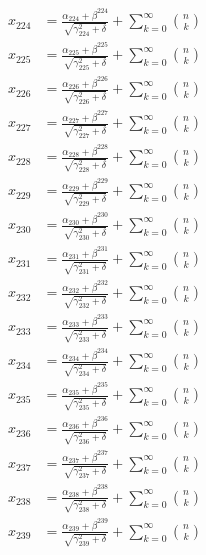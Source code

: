 \documentclass{article}
\begin{document}
\begin{align}
  x_{224} &= \frac{\alpha_{224} + \beta^{224}}{\sqrt{\gamma_{224}^2 + \delta}} + \sum_{k=0}^{\infty} \binom{n}{k} \label{eq:224} \\
  x_{225} &= \frac{\alpha_{225} + \beta^{225}}{\sqrt{\gamma_{225}^2 + \delta}} + \sum_{k=0}^{\infty} \binom{n}{k} \label{eq:225} \\
  x_{226} &= \frac{\alpha_{226} + \beta^{226}}{\sqrt{\gamma_{226}^2 + \delta}} + \sum_{k=0}^{\infty} \binom{n}{k} \label{eq:226} \\
  x_{227} &= \frac{\alpha_{227} + \beta^{227}}{\sqrt{\gamma_{227}^2 + \delta}} + \sum_{k=0}^{\infty} \binom{n}{k} \label{eq:227} \\
  x_{228} &= \frac{\alpha_{228} + \beta^{228}}{\sqrt{\gamma_{228}^2 + \delta}} + \sum_{k=0}^{\infty} \binom{n}{k} \label{eq:228} \\
  x_{229} &= \frac{\alpha_{229} + \beta^{229}}{\sqrt{\gamma_{229}^2 + \delta}} + \sum_{k=0}^{\infty} \binom{n}{k} \label{eq:229} \\
  x_{230} &= \frac{\alpha_{230} + \beta^{230}}{\sqrt{\gamma_{230}^2 + \delta}} + \sum_{k=0}^{\infty} \binom{n}{k} \label{eq:230} \\
  x_{231} &= \frac{\alpha_{231} + \beta^{231}}{\sqrt{\gamma_{231}^2 + \delta}} + \sum_{k=0}^{\infty} \binom{n}{k} \label{eq:231} \\
  x_{232} &= \frac{\alpha_{232} + \beta^{232}}{\sqrt{\gamma_{232}^2 + \delta}} + \sum_{k=0}^{\infty} \binom{n}{k} \label{eq:232} \\
  x_{233} &= \frac{\alpha_{233} + \beta^{233}}{\sqrt{\gamma_{233}^2 + \delta}} + \sum_{k=0}^{\infty} \binom{n}{k} \label{eq:233} \\
  x_{234} &= \frac{\alpha_{234} + \beta^{234}}{\sqrt{\gamma_{234}^2 + \delta}} + \sum_{k=0}^{\infty} \binom{n}{k} \label{eq:234} \\
  x_{235} &= \frac{\alpha_{235} + \beta^{235}}{\sqrt{\gamma_{235}^2 + \delta}} + \sum_{k=0}^{\infty} \binom{n}{k} \label{eq:235} \\
  x_{236} &= \frac{\alpha_{236} + \beta^{236}}{\sqrt{\gamma_{236}^2 + \delta}} + \sum_{k=0}^{\infty} \binom{n}{k} \label{eq:236} \\
  x_{237} &= \frac{\alpha_{237} + \beta^{237}}{\sqrt{\gamma_{237}^2 + \delta}} + \sum_{k=0}^{\infty} \binom{n}{k} \label{eq:237} \\
  x_{238} &= \frac{\alpha_{238} + \beta^{238}}{\sqrt{\gamma_{238}^2 + \delta}} + \sum_{k=0}^{\infty} \binom{n}{k} \label{eq:238} \\
  x_{239} &= \frac{\alpha_{239} + \beta^{239}}{\sqrt{\gamma_{239}^2 + \delta}} + \sum_{k=0}^{\infty} \binom{n}{k} \label{eq:239} \\

\end{align}
\end{document}
